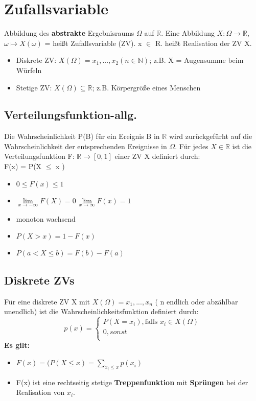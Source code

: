 \section{Zufallsvariable}
Abbildung des \textbf{abstrakte} Ergebnisraums $\Omega$ auf $\mathbb{R}$.
Eine Abbildung $X: \Omega \rightarrow \mathbb{R}$, $\omega \mapsto X(\omega)$ = heißt Zufallsvariable (ZV). x $\in$ R. heißt Realisation der ZV X.
  \begin{itemize}
    \item Diskrete ZV: $X(\Omega) = {x_{1}, ..., x_{2}} (n \in \mathbb{N})$; z.B. X = \dq Augensumme beim Würfeln \dq
    \item Stetige ZV: $X(\Omega) \subseteq \mathbb{R}$; \dq z.B. Körpergröße eines Menschen\dq
  \end{itemize}
\subsection{Verteilungsfunktion-allg.}
Die Wahrscheinlichkeit P(B) für ein Ereignis B in $ \mathbb{R} $ wird zurückgefürht auf die Wahrscheinlichkeit der entsprechenden Ereignisse in 
$ \Omega $. Für jedes $ X \in \mathbb{R} $  ist die Verteilungsfunktion F: $ \mathbb{R} \rightarrow [0,1] $ einer ZV X definiert durch:\\
	F(x) = P(X $ \leq $ x )
\begin{itemize}
	\item $ 0 \leq F(x) \leq 1 $
	\item $\lim\limits_{x\to-\infty} F(X)= 0 \, \lim\limits_{x\to\infty} F(x) = 1$
	\item monoton wachsend
	\item $P(X > x) = 1 - F(x)$
	\item $P(a < X \leq b) = F(b) - F(a)$
\end{itemize}
\subsection{Diskrete ZVs}
Für eine diskrete ZV X mit $X(\Omega) = {x_{1}, ..., x_{n}}$ ( n endlich oder abzählbar unendlich) ist die Wahrscheinlichkeitsfunktion definiert durch:\\
\begin{equation}
p(x) =
\begin{cases}
	P(X = x_{i}), \text{falls } x_{i} \in X(\Omega )\\
	0, sonst\\
\end{cases}
\end{equation}
\textbf{Es gilt:}
\begin{itemize}
	\item $F(x) = (P(X \leq x) = \sum_{x_{i}\leq x} p(x_{i})$
	\item F(x) ist eine rechtseitig stetige \textbf{Treppenfunktion} mit \textbf{Sprüngen} bei der Realisation von $x_{i}$.
\end{itemize}
